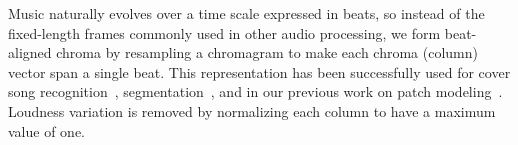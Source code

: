 \documentclass{article}
\begin{document}
Music naturally evolves over a time scale expressed in beats, 
so instead of the fixed-length frames commonly used in other audio
processing, we form beat-aligned chroma by
resampling a chromagram to make each chroma (column) vector span a
single beat.  This representation has been successfully used for cover
song recognition~\cite{Ellis2007a}, segmentation~\cite{Weiss2010}, and
in our previous work on patch modeling~\cite{Bertin-Mahieux2010a}. 
Loudness variation is removed by 
normalizing each column to have a maximum value of one.




\end{document}
